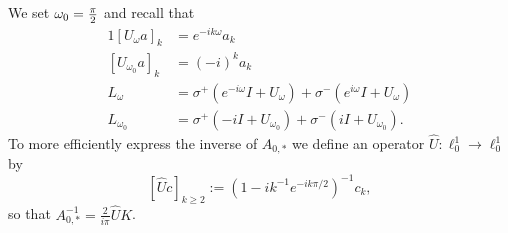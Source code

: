 We set $\omega_0 = \tfrac{\pi}{2}$ and recall that 
\begin{alignat*}{1}
	[U_\omega a]_k & =  e^{-i k\omega} a_k \\
	[U_{\omega_0} a]_k & = (-i)^k a_k \\
	L_{\omega}  & =  \sigma^+( e^{-i\omega}  I + U_{\omega}) + \sigma^-( e^{i\omega} I + U_{\omega})  \\
	L_{\omega_0} & = \sigma^+( -i  I + U_{\omega_0}) + \sigma^-( i I + U_{\omega_0})  .
\end{alignat*}
To more efficiently express the inverse of $ A_{0,*}$ we define an operator $\hat{U}: \ell^1_0 \to \ell^1_0 $ by
%
\begin{equation}\label{e:defUhat}
[\hat{U} c]_{k\geq 2} := (1 - i k^{-1}e^{-i k \pi /2} )^{-1} c_k,
\end{equation}
so that  
$ A_{0,*}^{-1}=  \frac{2}{ i \pi } \hat{U} K $.
%
%

%

